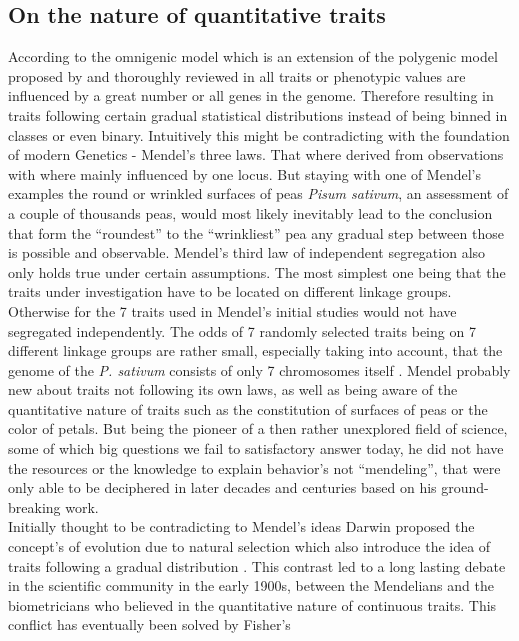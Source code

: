 \subsection{On the nature of quantitative traits}
According to the omnigenic model which is an extension of the polygenic model proposed by \cite{boyle2017expanded} and
thoroughly reviewed in \cite{timpson2018} all traits or phenotypic values are influenced by a great number or all genes
in the genome. Therefore resulting in traits following certain gradual statistical distributions instead of being binned
in classes or even binary. Intuitively this might be contradicting with the foundation of modern Genetics - Mendel's
three laws. That where derived from observations with where mainly influenced by one locus. But staying with one of
Mendel's examples the round or wrinkled surfaces of peas \textit{Pisum sativum}, an assessment of a couple of thousands
peas, would most likely inevitably lead to the conclusion that form the ``roundest'' to the ``wrinkliest'' pea any
gradual step between those is possible and observable. Mendel's third law of independent segregation also only holds
true under certain assumptions. The most simplest one being that the traits under investigation have to be located on
different linkage groups. Otherwise for the 7 traits used in Mendel's initial studies would not have segregated
independently. The odds of 7 randomly selected traits being on 7 different linkage groups are rather small, especially
taking into account, that the genome of the \textit{P. sativum} consists of only 7 chromosomes itself
\cite{kalo2004}. Mendel probably new about traits not following its own laws, as well as being aware of the quantitative
nature of traits such as the constitution of surfaces of peas or the color of petals. But being the pioneer of a then
rather unexplored field of science, some of which big questions we fail to satisfactory answer today, he did not have
the resources or the knowledge to explain behavior's not ``mendeling'', that were only able to be deciphered in later
decades and centuries
based on his ground-breaking work. \\
Initially thought to be contradicting to Mendel's ideas Darwin proposed the concept's of evolution due to natural
selection which also introduce the idea of traits following a gradual distribution \cite{darwin1859}. This contrast led
to a long lasting debate in the scientific community in the early 1900s, between the Mendelians and the biometricians
who believed in the quantitative nature of continuous traits. This conflict has eventually been solved by Fisher's
